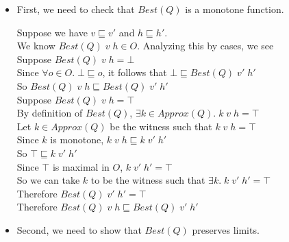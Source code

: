 \begin{itemize}
\item First, we need to check that $Best(Q)$ is a monotone function. 

\begin{tabbedproof}
\oo Suppose we have $v \sqsubseteq v'$ and $h \sqsubseteq h'$. \\
\ooo We know $Best(Q)\;v\;h \in O$. Analyzing this by cases, we see \\
\ooo Suppose $Best(Q)\;v\;h = \bot$ \\
\oooo Since $\forall o \in O.\; \bot \sqsubseteq o$, it follows that 
      $\bot \sqsubseteq Best(Q)\;v'\;h'$ \\
\oooo So $Best(Q)\;v\;h \sqsubseteq Best(Q)\;v'\;h'$ \\
\ooo Suppose $Best(Q)\;v\;h = \top$ \\
\oooo By definition of $Best(Q)$, $\exists k \in Approx(Q).\; k\;v\;h = \top$ \\
\oooo Let $k \in Approx(Q)$ be the witness such that $k\;v\;h = \top$ \\ 
\ooooo Since $k$ is monotone, $k\;v\;h \sqsubseteq k\;v'\;h'$ \\
\ooooo So $\top \sqsubseteq k\;v'\;h'$ \\
\ooooo Since $\top$ is maximal in $O$, $k\;v'\;h' = \top$ \\
\ooooo So we can take $k$ to be the witness such that $\exists k.\; k\;v'\;h' = \top$ \\
\oooo Therefore $Best(Q)\;v'\;h' = \top$ \\
\oooo Therefore $Best(Q)\;v\;h \sqsubseteq Best(Q)\;v'\;h'$ \\
\end{tabbedproof}

\item Second, we need to show that $Best(Q)$ preserves limits. 


\end{itemize}
